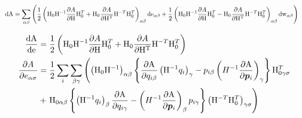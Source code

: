 \documentclass[11pt,a4paper,uplatex]{jsarticle}
\begin{document}
\begin{align}
    {\rm dA} &= \sum_{\alpha \beta} \left( 
    \frac{1}{2}\left({\rm H}_{0} {\rm H}^{-1} \frac{\partial A}{\partial {\rm H}} {\rm H}_{0}^{T} + {\rm H}_{0} \frac{\partial A}{\partial {\rm H^{T}}} {\rm H}^{-T}{\rm H}_{0}^{T}  \right)_{\alpha \beta} {\rm de}_{\alpha \beta}
     + \frac{1}{2}\left({\rm H}_{0} {\rm H}^{-1} \frac{\partial A}{\partial {\rm H}} {\rm H}_{0}^{T} - {\rm H}_{0} \frac{\partial A}{\partial {\rm H^{T}}} {\rm H}^{-T}{\rm H}_{0}^{T}  \right)_{\alpha \beta} {\rm dw}_{\alpha \beta} 
     \right)
\end{align}

\begin{align}
    \frac{\rm dA}{\rm de} &= \frac{1}{2}\left({\rm H}_{0} {\rm H}^{-1} \frac{\partial A}{\partial {\rm H}} {\rm H}_{0}^{T} + {\rm H}_{0} \frac{\partial A}{\partial {\rm H^{T}}} {\rm H}^{-T}{\rm H}_{0}^{T}  \right) \\
    \frac{\partial A}{\partial e_{\alpha \sigma}} &= \frac{1}{2} \sum_{i} \sum_{\beta \gamma} \left( \left({\rm H}_{0} {\rm H}^{-1}\right)_{\alpha \beta}
     \left\{ \frac{\partial {\rm A}}{\partial q_{i \beta}} \left({\rm H}^{-1} q_{i}\right)_{\gamma}    -  p_{i \beta} \left( H^{-1} \frac{\partial {\rm A}}{\partial \bm{p}_{i}}  \right)_{\gamma} \right\} {\rm H}_{0 \gamma \sigma} ^{T}\right. \\
    &+ \left. {\rm H}_{0 \alpha \beta}  \left\{ \left({\rm H}^{-1} q_{i}\right)_{\beta} \frac{\partial {\rm A}}{\partial q_{i \gamma}}  -  \left( H^{-1} \frac{\partial {\rm A}}{\partial \bm{p}_{i}}  \right)_{\beta} p_{i \gamma} \right\}   \left({\rm H}^{-T}{\rm H}_{0}^{T} \right)_{\gamma \sigma} \right) \\
\end{align}
\end{document}
